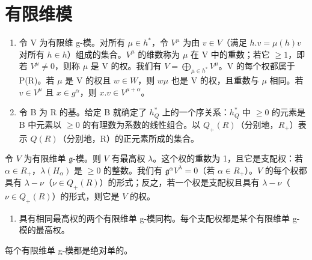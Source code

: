 \section*{有限维模}

\begin{enumerate}
\def\labelenumi{\arabic{enumi})}
\setcounter{enumi}{18}
\item
  令 V 为有限维 g-模。对所有 \(\mu\in h^{*}\)，令 \(V^{\mu}\) 为由 \(v\in V\)（满足 \(h.v=\mu(h)v\) 对所有 \(h\in h\)）组成的集合。\(V^{\mu}\) 的维数称为 \(\mu\) 在 V 中的重数；若它 \(\geq1\)，即若 \(V^{\mu}\neq0\)，则称 \(\mu\) 是 V 的权。我们有 \(V=\bigoplus_{\mu\in h^{*}}V^{\mu}\)。V 的每个权都属于 P(R)。若 \(\mu\) 是 V 的权且 \(w\in W\)，则 \(w\mu\) 也是 V 的权，且重数与 \(\mu\) 相同。若 \(v\in V^{\mu}\) 且 \(x\in g^{\alpha}\)，则 \(x.v\in V^{\mu+\alpha}\)。
\item
  令 B 为 R 的基。给定 B 就确定了 \(h_{Q}^{*}\) 上的一个序关系：\(h_{Q}^{*}\) 中 \(\geq 0\) 的元素是 B 中元素以 \(\geq 0\) 的有理数为系数的线性组合。以 \(Q_{+}(R)\)（分别地，\(R_{+}\)）表示 \(Q(R)\)（分别地，R）的正元素所成的集合。
\end{enumerate}

令 \(V\) 为有限维单 \(\mathfrak{g}\)-模。则 \(V\) 有最高权 \(\lambda\)。这个权的重数为 1，且它是支配权：若 \(\alpha \in R_{+}\)，\(\lambda(H_{\alpha})\) 是 \(\geq 0\) 的整数。我们有 \(\mathfrak{g}^{\alpha}V^{\lambda} = 0\)（若 \(\alpha \in R_{+}\)）。\(V\) 的每个权都具有 \(\lambda - \nu\)（\(\nu \in Q_{+}(R)\)）的形式；反之，若一个权是支配权且具有 \(\lambda - \nu\)（\(\nu \in Q_{+}(R)\)）的形式，则它是 \(V\) 的权。

\begin{enumerate}
\def\labelenumi{\arabic{enumi})}
\setcounter{enumi}{20}
\tightlist
\item
  具有相同最高权的两个有限维单 g-模同构。每个支配权都是某个有限维单 g-模的最高权。
\end{enumerate}

每个有限维单 g-模都是绝对单的。

